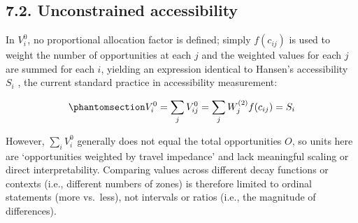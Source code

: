 \documentclass[
  10pt,
  letterpaper,
]{article}
\begin{document}
\subsection{7.2. Unconstrained
accessibility}\label{unconstrained-accessibility}

In \(V^0_i\), no proportional allocation factor is defined; simply
\(f(c_{ij})\) is used to weight the number of opportunities at each
\(j\) and the weighted values for each \(j\) are summed for each \(i\),
yielding an expression identical to Hansen's accessibility \(S_i\)
\citep{hansen1959}, the current standard practice in accessibility
measurement:

\begin{equation}\phantomsection\label{eq-unconstrained-accessibility}{
V^0_i = \sum_j V^0_{ij} = \sum_j W^{(2)}_jf(c_{ij}) = S_i
}\end{equation}

However, \(\sum_i V^0_{i}\) generally does not equal the total
opportunities \(O\), so units here are `opportunities weighted by travel
impedance' and lack meaningful scaling or direct interpretability.
Comparing values across different decay functions or contexts (i.e.,
different numbers of zones) is therefore limited to ordinal statements
(more vs.~less), not intervals or ratios (i.e., the magnitude of
differences).

\begin{table}

\caption{\label{tbl-simple-example-unconstrained-accessibility}Simple
system: unconstrained accessibility.}


\end{table}%
\end{document}
